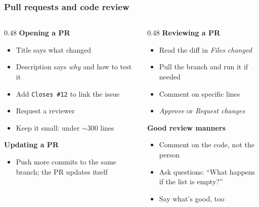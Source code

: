 \documentclass[aspectratio=169,10pt,compress]{beamer}
\begin{document}
\begin{frame}[t,fragile] \frametitle{Pull requests and code review}
  \begin{columns}[T]
    \begin{column}{0.48\textwidth}
      \textbf{Opening a PR}
      \begin{itemize}\small
        \item Title says what changed
        \item Description says \emph{why} and how to test it
        \item Add \texttt{Closes \#12} to link the issue
        \item Request a reviewer
        \item Keep it small: under $\sim$300 lines
      \end{itemize}
      \vspace{0.3em}
      \textbf{Updating a PR}
      \begin{itemize}\small
        \item Push more commits to the same branch; the PR updates itself
      \end{itemize}
    \end{column}
    \begin{column}{0.48\textwidth}
      \textbf{Reviewing a PR}
      \begin{itemize}\small
        \item Read the diff in \emph{Files changed}
        \item Pull the branch and run it if needed
        \item Comment on specific lines
        \item \emph{Approve} or \emph{Request changes}
      \end{itemize}
      \vspace{0.3em}
      \textbf{Good review manners}
      \begin{itemize}\small
        \item Comment on the code, not the person
        \item Ask questions: ``What happens if the list is empty?''
        \item Say what's good, too
      \end{itemize}
    \end{column}
  \end{columns}
\end{frame}
\end{document}
